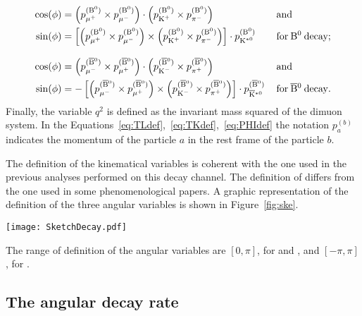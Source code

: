 \begin{equation} \label{eq:PHIdef}
  \begin{aligned}
    \cos(\phi) &= \left( p_{\mu^{+}}^{({\textrm{B}}{}^{0})} \times p_{\mu^{-}}^{({\textrm{B}}{}^{0})} \right) \cdot \left( p_{\textrm{K}^{+}}^{({\textrm{B}}{}^{0})} \times p_{\pi^{-}}^{({\textrm{B}}{}^{0})} \right) \, && \mathrm{and} \\
    \sin(\phi) &= \left[ \left( p_{\mu^{+}}^{({\textrm{B}}{}^{0})} \times p_{\mu^{-}}^{({\textrm{B}}{}^{0})} \right) \times \left( p_{\textrm{K}^{+}}^{({\textrm{B}}{}^{0})} \times p_{\pi^{-}}^{({\textrm{B}}{}^{0})} \right) \right] \cdot p_{\textrm{K}^{\ast0}}^{({\textrm{B}}{}^{0})}\, && \mathrm{for}\:{\textrm{B}}{}^{0}\:\mathrm{decay;} \\[8pt]
    \cos(\phi) &= \left( p_{\mu^{-}}^{(\overline{\textrm{B}}{}^{0})} \times p_{\mu^{+}}^{(\overline{\textrm{B}}{}^{0})} \right) \cdot \left( p_{\textrm{K}^{-}}^{(\overline{\textrm{B}}{}^{0})} \times p_{\pi^{+}}^{(\overline{\textrm{B}}{}^{0})} \right) \, && \mathrm{and} \\
    \sin(\phi) &=-\left[ \left( p_{\mu^{-}}^{(\overline{\textrm{B}}{}^{0})} \times p_{\mu^{+}}^{(\overline{\textrm{B}}{}^{0})} \right) \times \left( p_{\textrm{K}^{-}}^{(\overline{\textrm{B}}{}^{0})} \times p_{\pi^{+}}^{(\overline{\textrm{B}}{}^{0})} \right) \right] \cdot p_{\overline{\textrm{K}}{}^{\ast0}}^{(\overline{\textrm{B}}{}^{0})}\, && \mathrm{for}\:\overline{\textrm{B}}{}^{0}\:\mathrm{decay.} \\
  \end{aligned}
\end{equation}
Finally, the variable $q^2$ is defined as the invariant mass squared of the dimuon system.
In the Equations~\ref{eq:TLdef},~\ref{eq:TKdef},~\ref{eq:PHIdef} the notation $p_a^{(b)}$ indicates the momentum of the particle $a$ in the rest frame of the particle $b$.

The definition of the kinematical variables is coherent with the one used in the previous analyses performed on this decay channel.
The definition of \TL differs from the one used in some phenomenological papers.
A graphic representation of the definition of the three angular variables is shown in Figure~\ref{fig:ske}.

\begin{figure*}[!tbh]
  \begin{center}
    \texttt{[image: SketchDecay.pdf]}
    \caption{Illustration of the angular variables \TL (left), \TK (middle), and \PHI (right) for the decay \BtoKstmumudecay.}
    \label{fig:ske}
  \end{center}
\end{figure*}

The range of definition of the angular variables are $\left[0,\pi\right]$, for \TL and \TK, and $\left[-\pi,\pi\right]$, for \PHI.


\subsection{The angular decay rate}
\label{sec:decRate}

